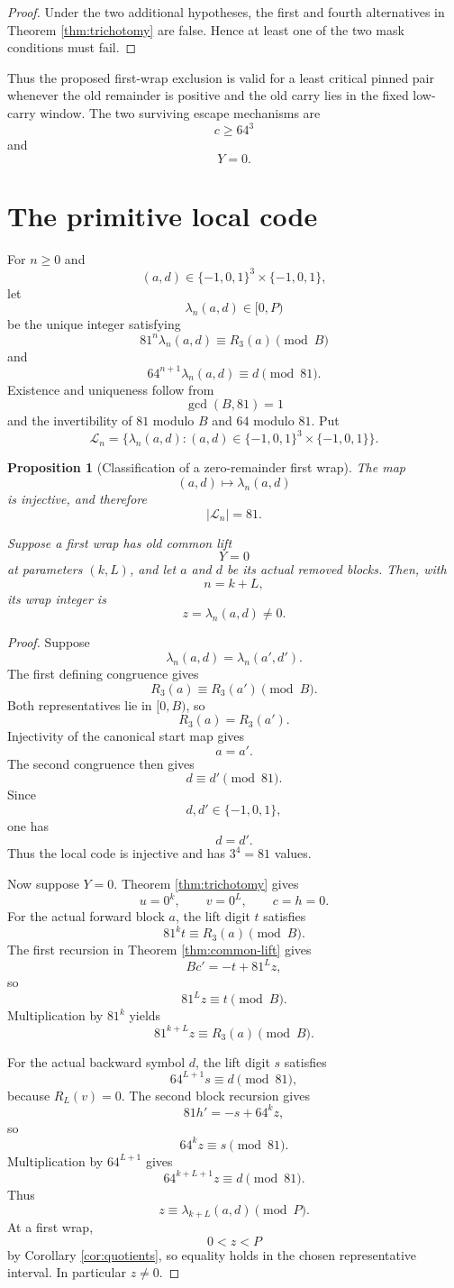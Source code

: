\documentclass[11pt]{article}
\newtheorem{proposition}[theorem]{Proposition}
\theoremstyle{remark}
\newcommand{\E}{\{-1,0,1\}}
\newcommand{\Lset}{\mathcal{L}}
\begin{document}
\begin{proof}
Under the two additional hypotheses, the first and fourth alternatives in Theorem \ref{thm:trichotomy} are false.  Hence at least one of the two mask conditions must fail.
\end{proof}

Thus the proposed first-wrap exclusion is valid for a least critical pinned pair whenever the old remainder is positive and the old carry lies in the fixed low-carry window.  The two surviving escape mechanisms are
\[
c\ge64^3
\]
and
\[
Y=0.
\]

\section{The primitive local code}

For \(n\ge0\) and
\[
(a,d)\in\E^3\times\E,
\]
let
\[
\lambda_n(a,d)\in[0,P)
\]
be the unique integer satisfying
\[
81^n\lambda_n(a,d)
\equiv
R_3(a)
\pmod B
\]
and
\[
64^{n+1}\lambda_n(a,d)
\equiv
d
\pmod{81}.
\]
Existence and uniqueness follow from
\[
\gcd(B,81)=1
\]
and the invertibility of \(81\) modulo \(B\) and \(64\) modulo \(81\).  Put
\[
\Lset_n=
\{\lambda_n(a,d):(a,d)\in\E^3\times\E\}.
\]

\begin{proposition}[Classification of a zero-remainder first wrap]
\label{prop:primitive}
The map
\[
(a,d)\longmapsto\lambda_n(a,d)
\]
is injective, and therefore
\[
|\Lset_n|=81.
\]

Suppose a first wrap has old common lift
\[
Y=0
\]
at parameters \((k,L)\), and let \(a\) and \(d\) be its actual removed blocks.  Then, with
\[
n=k+L,
\]
its wrap integer is
\[
z=\lambda_n(a,d)\ne0.
\]
\end{proposition}

\begin{proof}
Suppose
\[
\lambda_n(a,d)=\lambda_n(a',d').
\]
The first defining congruence gives
\[
R_3(a)\equiv R_3(a')\pmod B.
\]
Both representatives lie in \([0,B)\), so
\[
R_3(a)=R_3(a').
\]
Injectivity of the canonical start map gives
\[
a=a'.
\]
The second congruence then gives
\[
d\equiv d'\pmod{81}.
\]
Since
\[
d,d'\in\{-1,0,1\},
\]
one has
\[
d=d'.
\]
Thus the local code is injective and has \(3^4=81\) values.

Now suppose \(Y=0\).  Theorem \ref{thm:trichotomy} gives
\[
u=0^k,\qquad v=0^L,\qquad c=h=0.
\]
For the actual forward block \(a\), the lift digit \(t\) satisfies
\[
81^kt\equiv R_3(a)\pmod B.
\]
The first recursion in Theorem \ref{thm:common-lift} gives
\[
Bc'=-t+81^Lz,
\]
so
\[
81^Lz\equiv t\pmod B.
\]
Multiplication by \(81^k\) yields
\[
81^{k+L}z\equiv R_3(a)\pmod B.
\]

For the actual backward symbol \(d\), the lift digit \(s\) satisfies
\[
64^{L+1}s\equiv d\pmod{81},
\]
because \(R_L(v)=0\).  The second block recursion gives
\[
81h'=-s+64^kz,
\]
so
\[
64^kz\equiv s\pmod{81}.
\]
Multiplication by \(64^{L+1}\) gives
\[
64^{k+L+1}z\equiv d\pmod{81}.
\]
Thus
\[
z\equiv\lambda_{k+L}(a,d)\pmod P.
\]
At a first wrap,
\[
0<z<P
\]
by Corollary \ref{cor:quotients}, so equality holds in the chosen representative interval.  In particular \(z\ne0\).
\end{proof}
\end{document}
